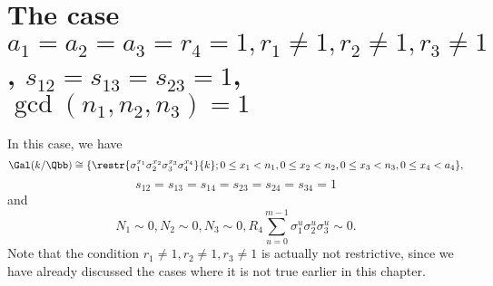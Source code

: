 \section{The case $a_1=a_2=a_3=r_4=1, r_1\neq 1, r_2\neq 1, r_3 \neq 1$, $s_{12}=s_{13}=s_{23}=1$, $\gcd(n_1,n_2,n_3)=1$}
In this case, we have
\begin{equation*}
\Gal(k/\Qbb)\cong
 \{\restr{\sigma_1^{x_1}\sigma_2^{x_2}\sigma_3^{x_3}\sigma_4^{x_4}}{k};  0\leq x_1<n_1, 0\leq x_2<n_2,  0\leq x_3<n_3,0\leq x_4<a_4\},
\end{equation*}
 $$s_{12}=s_{13}=s_{14}=s_{23}=s_{24}=s_{34}=1$$
and $$N_1\sim 0, N_2\sim 0, N_3\sim 0, R_4\sum_{u=0}^{m-1}\sigma_1^u\sigma_2^u\sigma_3^u\sim0.$$
Note that the condition $r_1\neq 1, r_2\neq 1, r_3 \neq 1$ is actually not restrictive, since we have already discussed the cases where it is not true earlier in this chapter. %

